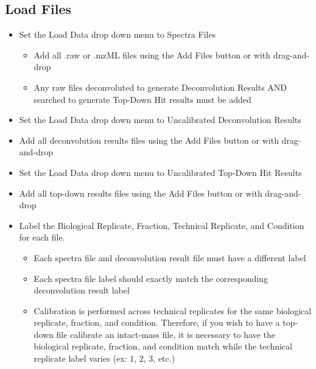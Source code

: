 \subsection{Load Files}
\begin{itemize}
\item Set the Load Data drop down menu to Spectra Files
\begin{itemize}
\item Add all .raw or .mzML files using the Add Files button or with drag-and-drop
\item Any raw files deconvoluted to generate Deconvolution Results AND searched to generate Top-Down Hit results must be added
\end{itemize}
\item Set the Load Data drop down menu to Uncalibrated Deconvolution Results
\item Add all deconvolution results files using the Add Files button or with drag-and-drop
\item Set the Load Data drop down menu to Uncalibrated Top-Down Hit Results
\item Add all top-down results files using the Add Files button or with drag-and-drop
\item Label the Biological Replicate, Fraction, Technical Replicate, and Condition for each file. 
\begin{itemize}
	\item Each spectra file and deconvolution result file must have a different label
	\item Each spectra file label should exactly match the corresponding deconvolution result label
	\item Calibration is performed across technical replicates for the same biological replicate, fraction, and condition. Therefore, if you wish to have a top-down file calibrate an intact-mass file, it is necessary to have the biological replicate, fraction, and condition match while the technical replicate label varies (ex: 1, 2, 3, etc.)
\end{itemize}
\end{itemize}

